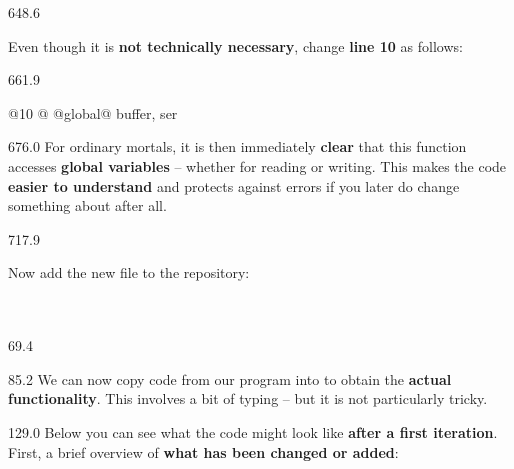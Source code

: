\documentclass{aslab}
\newcommand*\codex[1]{\fontsize{10bp}{#1bp}\ttfamily\lineskiplimit=-\maxdimen}
\begin{document}
\begin{region}[pitch=13.3]{648.6}
\begin{ptasks}[start=5]
\item Even though it is \textbf{not technically necessary}, change
  \textbf{line 10} as follows:
\end{ptasks}
\end{region}

\begin{region}[x=74.7,right=0]{661.9}
\begin{codeblock}[style=py,basicstyle=\codex{12}]
@10 @    @global@ buffer, ser
\end{codeblock}
\end{region}

\begin{region}[x=74.7,right=0,pitch=14.3]{676.0}
For ordinary mortals, it is then immediately \textbf{clear} that this
function accesses \textbf{global variables} -- whether for reading or
writing. This makes the code \textbf{easier to understand} and protects
against errors if you later do change something about  after all.
\end{region}

\begin{region}[pitch=13.4]{717.9}
\begin{ptasks}[start=6]
\item Now add the new file to the repository:\\
  \\
  \\
\end{ptasks}
\end{region}

\nextpage
\begin{region}{69.4}
\end{region}

\begin{region}[pitch=13.75]{85.2}
We can now copy code from our program  into
 to obtain the \textbf{actual functionality}. This
involves a bit of typing -- but it is not particularly tricky.
\end{region}

\begin{region}[pitch=14.3]{129.0}
Below you can see what the code might look like \textbf{after a first
iteration}. First, a brief overview of \textbf{what has been changed or
added}:
\end{region}
\end{document}
